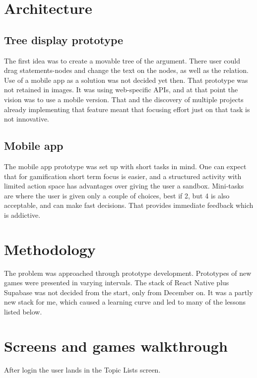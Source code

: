\documentclass{report}
\begin{document}
\section{Architecture}
\subsection{Tree display prototype}
The first idea was to create a movable tree of the argument. There user could drag statements-nodes and change the text on the nodes, as well as the relation.
Use of a mobile app as a solution was not decided yet then. That prototype was not retained in images. It was using web-specific APIs, and at that point the vision was to use a mobile version. That and the discovery of multiple projects already implementing that feature meant that focusing effort just on that task is not innovative. 

\subsection{Mobile app}
The mobile app prototype was set up with short tasks in mind. One can expect that for gamification short term focus is easier, and a structured activity with limited action space has advantages over giving the user a sandbox. Mini-tasks are where the user is given only a couple of choices, best if 2, but 4 is also acceptable, and can make fast decisions. That provides immediate feedback which is addictive. 

\section{Methodology}
The problem was approached through prototype development. Prototypes of new games were presented in varying intervals. The stack of React Native plus Supabase was not decided from the start, only from December on. It was a partly new stack for me, which caused a learning curve and led to many of the lessons listed below.

\section{Screens and games walkthrough}
After login the user lands in the Topic Lists screen.
\end{document}
